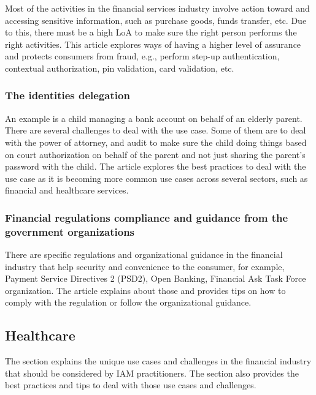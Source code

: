 Most of the activities in the financial services industry involve action
toward and accessing sensitive information, such as purchase goods,
funds transfer, etc. Due to this, there must be a high LoA to make sure
the right person performs the right activities. This article explores
ways of having a higher level of assurance and protects consumers from
fraud, e.g., perform step-up authentication, contextual authorization,
pin validation, card validation, etc.

\hypertarget{the-identities-delegation}{%
\subsubsection{The identities delegation}\label{the-identities-delegation}}

An example is a child managing a bank account on behalf of an elderly
parent. There are several challenges to deal with the use case. Some of
them are to deal with the power of attorney, and audit to make sure the
child doing things based on court authorization on behalf of the parent
and not just sharing the parent's password with the child. The article
explores the best practices to deal with the use case as it is becoming
more common use cases across several sectors, such as financial and
healthcare services.

\hypertarget{financial-regulations-compliance-and-guidance-from-the-government-organizations}{%
\subsubsection{Financial regulations compliance and guidance from the
government
organizations}\label{financial-regulations-compliance-and-guidance-from-the-government-organizations}}

There are specific regulations and organizational guidance in the
financial industry that help security and convenience to the consumer,
for example, Payment Service Directives 2 (PSD2), Open Banking,
Financial Ask Task Force organization. The article explains about those
and provides tips on how to comply with the regulation or follow the
organizational guidance.

\hypertarget{healthcare}{%
\subsection{Healthcare}\label{healthcare}}

The section explains the unique use cases and challenges in the
financial industry that should be considered by IAM practitioners. The
section also provides the best practices and tips to deal with those use
cases and challenges.

